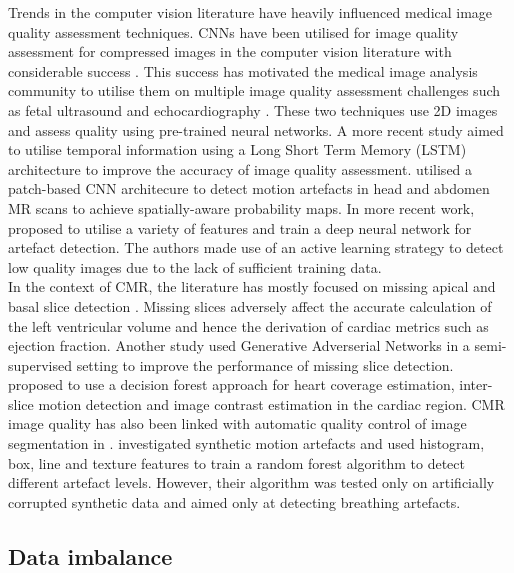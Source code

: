 \documentclass[preprint,12pt,authoryear]{elsarticle}
\begin{document}
Trends in the computer vision literature have heavily influenced medical image quality assessment techniques.
CNNs have been utilised for image quality assessment for compressed images in the computer vision literature with considerable success \citep{Kang2014}. This success has motivated the medical image analysis community to utilise them on multiple image quality assessment challenges such as fetal ultrasound \citep{Wu2017} and echocardiography \citep{Abdi2017}. These two techniques use 2D images and assess quality using pre-trained neural networks. A more recent study \citep{Abdi2017a} aimed to utilise temporal information using a Long Short Term Memory (LSTM) architecture to improve the accuracy of image quality assessment. \cite{Kuestner2018a} utilised a patch-based CNN architecure to detect motion artefacts in head and abdomen MR scans to achieve spatially-aware probability maps. In more recent work, \cite{Kuestner2018} proposed to utilise a variety of features and train a deep neural network for artefact detection. The authors made use of an active learning strategy to detect low quality images due to the lack of sufficient training data.\\


 In the context of CMR, the literature has mostly focused on  missing apical and basal slice detection \citep{Zhang2016}. Missing slices adversely affect the accurate calculation of the left ventricular volume and hence the derivation of cardiac metrics such as ejection fraction. Another study \citep{Zhang2017} used Generative Adverserial Networks in a semi-supervised setting to improve the performance of missing slice detection.
 \cite{Tarroni2018} proposed to use a decision forest approach for heart coverage estimation, inter-slice motion detection and image contrast estimation in the cardiac region.
 CMR image quality has also been linked with automatic quality control of image segmentation in \cite{Robinson2017}.
 \cite{Lorch2017} investigated synthetic motion artefacts and used histogram, box, line and texture features to train a random forest algorithm to detect different artefact levels. However, their algorithm was tested only on artificially corrupted synthetic data and aimed only at detecting breathing artefacts.


\subsection{Data imbalance}
\label{sec:dataimbalance}
\end{document}
